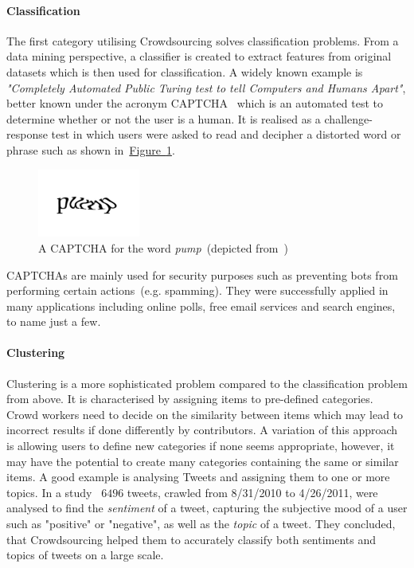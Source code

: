 \documentclass[draft,final]{vutinfth} %
\begin{document}
\paragraph{Classification} The first category utilising Crowdsourcing solves classification problems. From a data mining perspective, a classifier is created to extract features from original datasets which is then used for classification. A widely known example is \emph{"Completely Automated Public Turing test to tell Computers and Humans Apart"}, better known under the acronym CAPTCHA~\cite{ahn2003} which is an automated test to determine whether or not the user is a human. 
It is realised as a challenge-response test in which users were asked to read and decipher a distorted word or phrase such as shown in~\hyperref[fig:captcha]{Figure~\ref*{fig:captcha}}.
\begin{figure}
	 \centering
	 \includegraphics[width=0.3\textwidth]{drawio/CAPCHA}
	 \caption{A CAPTCHA for the word \emph{pump}~(depicted from~\cite{ahn2003})}\label{fig:captcha}
\end{figure}  
CAPTCHAs are mainly used for security purposes such as preventing bots from performing certain actions~(e.g. spamming). They were successfully applied in many applications including online polls, free email services and search engines, to name just a few. 

\paragraph{Clustering} Clustering is a more sophisticated problem compared to the classification problem from above. It is characterised by assigning items to
pre-defined categories. Crowd workers need to decide on the similarity between items which may lead to incorrect results if done differently by contributors. A variation of this approach is allowing users to define new categories if none seems appropriate, however, it may have the potential to create many categories containing the same or similar items. A good example is analysing Tweets and assigning them to one or more topics. In a study~\cite{huang2013} $6496$ tweets, crawled from 8/31/2010 to 4/26/2011, were analysed to find the \emph{sentiment} of a tweet, capturing the subjective mood of a user such as "positive" or "negative", as well as the \emph{topic} of a tweet. They concluded, that Crowdsourcing helped them to accurately classify both sentiments and topics of tweets on a large scale. 
\end{document}
